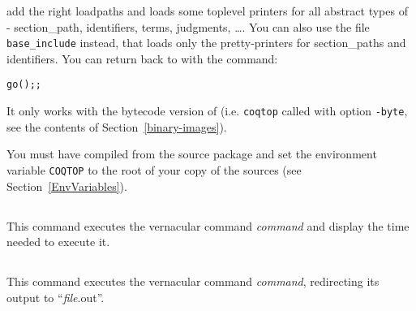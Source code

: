 \noindent add the right loadpaths and loads some toplevel printers for
all abstract types of \Coq - section\_path, identifiers, terms, judgments,
\dots. You can also use the file \texttt{base\_include} instead,
that loads only the pretty-printers for section\_paths and
identifiers.
You can return back to \Coq{} with the command: 

\begin{flushleft}
\begin{verbatim}
go();;
\end{verbatim}
\end{flushleft}

\begin{Warnings}
\item It only works with the bytecode version of {\Coq} (i.e. {\tt coqtop} called with option {\tt -byte}, see the contents of Section~\ref{binary-images}).
\item You must have compiled {\Coq} from the source package and set the
  environment variable \texttt{COQTOP} to the root of your copy of the sources (see Section~\ref{EnvVariables}).
\end{Warnings}

\subsection[\tt Time \textrm{\textsl{command}}.]{}
This command executes the vernacular command \textrm{\textsl{command}}
and display the time needed to execute it.

\subsection[\tt Redirect "\textrm{\textsl{file}}" \textrm{\textsl{command}}.]{}
This command executes the vernacular command \textrm{\textsl{command}}, redirecting its output to ``\textrm{\textsl{file}}.out''.

\subsection[\tt Timeout \textrm{\textsl{int}} \textrm{\textsl{command}}.]{}

